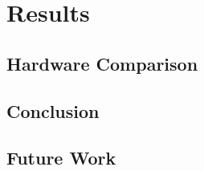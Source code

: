 \chapter{Results}
\label{cha:results}

\section{Hardware Comparison}
\section{Conclusion}
\section{Future Work}